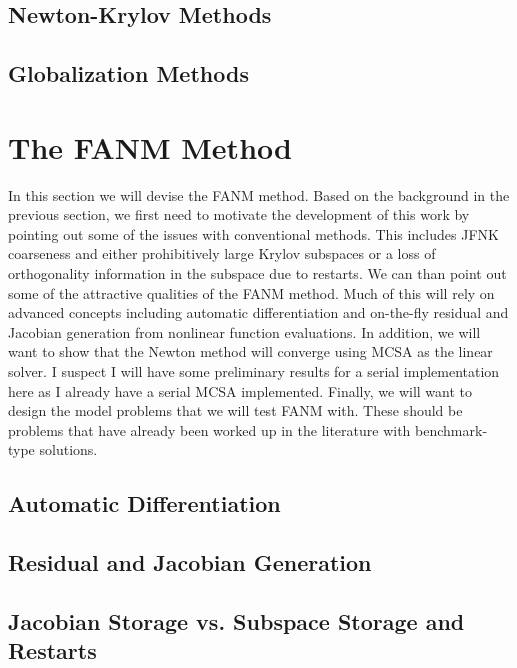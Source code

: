 \subsection{Newton-Krylov Methods}
\label{subsec:newton_krylov_methods}

\subsection{Globalization Methods}
\label{subsec:globalization_methods}

\section{The FANM Method}
\label{sec:fanm}
In this section we will devise the FANM method. Based on the
background in the previous section, we first need to motivate the
development of this work by pointing out some of the issues with
conventional methods. This includes JFNK coarseness and either
prohibitively large Krylov subspaces or a loss of orthogonality
information in the subspace due to restarts. We can than point out
some of the attractive qualities of the FANM method. Much of this will
rely on advanced concepts including automatic differentiation and
on-the-fly residual and Jacobian generation from nonlinear function
evaluations. In addition, we will want to show that the Newton method
will converge using MCSA as the linear solver. I suspect I will have
some preliminary results for a serial implementation here as I already
have a serial MCSA implemented. Finally, we will want to design the
model problems that we will test FANM with. These should be problems
that have already been worked up in the literature with benchmark-type
solutions.

\subsection{Automatic Differentiation}
\label{sec:automatic_differentiation}

\subsection{Residual and Jacobian Generation}
\label{sec:fanm_generation}

\subsection{Jacobian Storage vs. Subspace Storage and Restarts}
\label{sec:fanm_storage}
